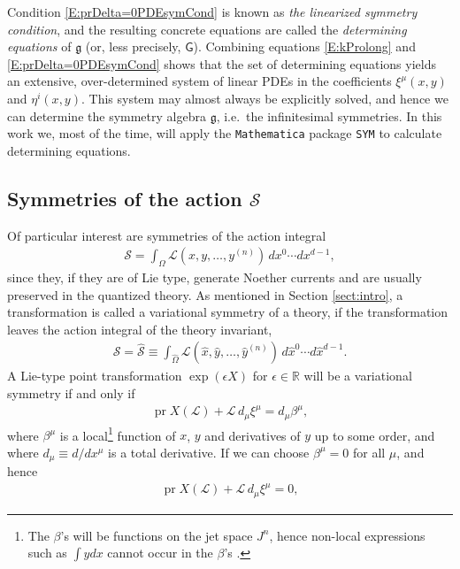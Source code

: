\documentclass[a4paper,hidelinks, 12pt]{article}
\numberwithin{equation}{section}
\theoremstyle{plain}
\newcommand{\La}{\mathfrak}
\newcommand{\Lg}{\mathsf}
\newcommand{\N}[1]{\mathbb{#1}}
\newcommand{\mc}{\mathcal}
\newcommand{\on}{\operatorname}
\begin{document}
 
Condition \eqref{E:prDelta=0PDEsymCond} is known as \textit{the linearized symmetry condition}, and the resulting concrete equations are called the \textit{determining 
equations} of $\La{g}$ (or, less precisely, $\Lg{G}$). Combining equations \eqref{E:kProlong} and \eqref{E:prDelta=0PDEsymCond} shows that the set of determining equations
yields an extensive, over-determined system of linear PDEs in the coefficients $\xi^{\mu}(x,y)$ and $\eta^{i}(x,y)$. This system may almost always be explicitly solved, and hence we can determine the symmetry algebra $\La{g}$, i.e.~the infinitesimal symmetries. In this work we, most of the time, will apply the \texttt{Mathematica} package \texttt{SYM} \cite{dimas2005sym} to calculate determining equations.
   
\subsection{Symmetries of the action $\mc{S}$}
\label{sec:SymmetriesOfTheActionMcS}
Of particular interest are symmetries of the action integral
\begin{align}
	\mc{S}=\int_{\Omega} \mc{L}({x},{y},\ldots,{y}^{(n)})\,dx^0\cdots dx^{d-1},
\end{align}
since they, if they are of Lie type, generate Noether currents and are usually preserved in the quantized theory. 
As mentioned in Section \ref{sect:intro}, a transformation is called a {variational symmetry} of a theory, if the transformation leaves the action integral of the theory invariant,
\begin{align}
	\mc{S}=\hat{\mc{S}}\equiv \int_{\hat{\Omega}} \mc{L}(\hat{x},\hat{y},\ldots,\hat{y}^{(n)})\,d\hat{x}^0\cdots d\hat{x}^{d-1}.
\end{align}
A Lie-type point transformation $\exp(\epsilon X)$ for $\epsilon \in \N{R}$ will be a variational symmetry if and only if
\begin{align}\label{E:condVarSym}
	\on{pr}X(\mc{L})+\mc{L}\,{d_\mu \xi^\mu}={d_\mu \beta^\mu},
\end{align}
where $\beta^\mu$ is a local\footnote{The $\beta$'s will be functions on the jet space $J^n$, hence non-local expressions such as $\int y dx$ cannot occur in the $\beta$'s \cite{olver1998applications}.} function of $x$, $y$ and derivatives of $y$ up to some order, and where $d_\mu\equiv {d}/{dx^\mu}$ is a total derivative. If we can choose 
	$\beta^\mu=0$ 
for all $\mu$,
and hence 
\begin{align}\label{E:condStrictVarSym}
	\on{pr}X(\mc{L})+\mc{L}\,{d_\mu \xi^\mu}=0,
\end{align}
\end{document}
